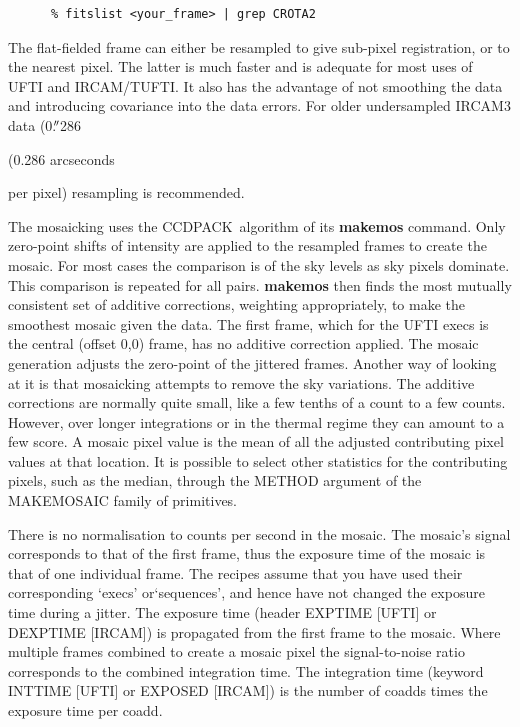 \documentclass[twoside,11pt]{article}
\newenvironment{latexonly}{}{}
\newcommand{\xref}[3]{#1}
\renewcommand{\_}{\texttt{\symbol{95}}}
\newcommand{\arcm}{\hbox{$^\prime$}}
\newcommand{\arcm}{{\rawhtml &acute;}}
\newcommand{\arcsec}{\arcm\hskip -0.1em\arcm}
\newcommand{\arcsec}{{\rawhtml &quot;}}
\newcommand{\uarcs}{\hskip-0.27em\arcsec\hskip-0.02em}
\newcommand{\uarcs}{{\rawhtml &quot;}}
\newcommand{\CCDPACK}{{\footnotesize CCDPACK}}
\begin{document}
\begin{verbatim}
      % fitslist <your_frame> | grep CROTA2
\end{verbatim}

The flat-fielded frame can either be resampled to give sub-pixel
registration, or to the nearest pixel. The latter is much faster and
is adequate for most uses of UFTI and IRCAM/TUFTI.  It also has the
advantage of not smoothing the data and introducing covariance
into the data errors.
For older
undersampled IRCAM3 data
\begin{latexonly}
(0.$\uarcs$286
\end{latexonly}
\begin{htmlonly}
(0.286 arcseconds
\end{htmlonly}
per pixel) resampling is recommended.

The mosaicking uses the \xref{\CCDPACK\ algorithm}{sun139}{mosaicing}
of its \xref{{\bf makemos}}{sun139}{MAKEMOS} command.  Only zero-point
shifts of intensity are applied to the resampled frames to create the
mosaic.  For most cases the comparison is of the sky levels as sky
pixels dominate.  This comparison is repeated for all pairs.  {\bf
makemos} then finds the most mutually consistent set of additive
corrections, weighting appropriately, to make the smoothest mosaic
given the data. The first frame, which for the UFTI execs is the
central (offset 0,0) frame, has no additive correction applied.  The
mosaic generation adjusts the zero-point of the jittered frames.
Another way of looking at it is that mosaicking attempts to remove the
sky variations.  The additive corrections are normally quite small,
like a few tenths of a count to a few counts.  However, over longer
integrations or in the thermal regime they can amount to a few score.
A mosaic pixel value is the mean of all the adjusted contributing
pixel values at that location.  It is possible to select other
statistics for the contributing pixels, such as the median, through
the METHOD argument of the \_MAKE\_MOSAIC\_ family of primitives.

There is no normalisation to counts per second in the mosaic. The
mosaic's signal corresponds to that of the first frame, thus the
exposure time of the mosaic is that of one individual frame.  The
recipes assume that you have used their corresponding `execs'
or`sequences', and hence have not changed the exposure time during a
jitter.  The exposure time (header EXP\_TIME [UFTI] or DEXPTIME
[IRCAM]) is propagated from the first frame to the mosaic.  Where
multiple frames combined to create a mosaic pixel the signal-to-noise
ratio corresponds to the combined integration time.  The integration
time (keyword INT\_TIME [UFTI] or EXPOSED [IRCAM]) is the number of
coadds times the exposure time per coadd.
\end{document}
